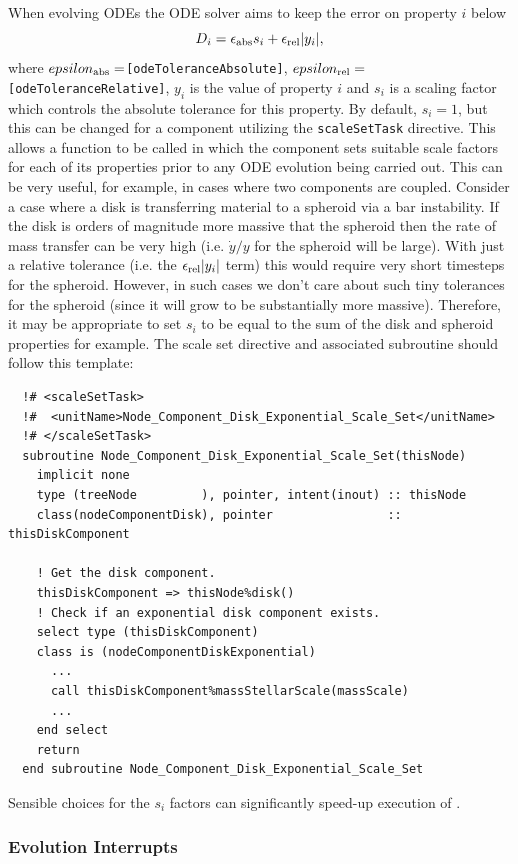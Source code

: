 When evolving ODEs the ODE solver aims to keep the error on property $i$ below
\begin{equation}
 D_i = \epsilon_{\rm abs} s_i + \epsilon_{\rm rel} |y_i|,
\end{equation}
where $epsilon_{\rm abs}=${\tt [odeToleranceAbsolute]}, $epsilon_{\rm rel}=${\tt [odeToleranceRelative]}, $y_i$ is the value of property $i$ and $s_i$ is a scaling factor which controls the absolute tolerance for this property. By default, $s_i=1$, but this can be changed for a component utilizing the {\tt scaleSetTask} directive. This allows a function to be called in which the component sets suitable scale factors for each of its properties prior to any ODE evolution being carried out. This can be very useful, for example, in cases where two components are coupled. Consider a case where a disk is transferring material to a spheroid via a bar instability. If the disk is orders of magnitude more massive that the spheroid then the rate of mass transfer can be very high (i.e. $\dot{y}/y$ for the spheroid will be large). With just a relative tolerance (i.e. the $\epsilon_{\rm rel} |y_i|$ term) this would require very short timesteps for the spheroid. However, in such cases we don't care about such tiny tolerances for the spheroid (since it will grow to be substantially more massive). Therefore, it may be appropriate to set $s_i$ to be equal to the sum of the disk and spheroid properties for example. The scale set directive and associated subroutine should follow this template:
\begin{verbatim}
  !# <scaleSetTask>
  !#  <unitName>Node_Component_Disk_Exponential_Scale_Set</unitName>
  !# </scaleSetTask>
  subroutine Node_Component_Disk_Exponential_Scale_Set(thisNode)
    implicit none
    type (treeNode         ), pointer, intent(inout) :: thisNode
    class(nodeComponentDisk), pointer                :: thisDiskComponent

    ! Get the disk component.
    thisDiskComponent => thisNode%disk()
    ! Check if an exponential disk component exists.
    select type (thisDiskComponent)
    class is (nodeComponentDiskExponential)
      ...
      call thisDiskComponent%massStellarScale(massScale)
      ...
    end select
    return
  end subroutine Node_Component_Disk_Exponential_Scale_Set
\end{verbatim}
Sensible choices for the $s_i$ factors can significantly speed-up execution of \glc.

\subsubsection{Evolution Interrupts}

